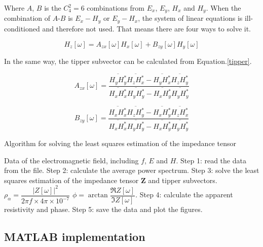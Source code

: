 \documentclass[9pt,a4paper,twoside]{rho-class/rho}
\begin{document}
Where $A$, $B$ is the $C_4^2=6$ combinations from $E_x$, $E_y$, $H_x$ and $H_y$. When the combination of $A$-$B$ is $E_x-H_y$ or $E_y-H_x$, the system of linear equations is ill-conditioned and therefore not used. That means there are four ways to solve it.

\begin{equation}
    \label{tipper}
    H_z[\omega]=A_{zx}[\omega]H_x[\omega]+B_{zy}[\omega]H_y[\omega]
\end{equation}

In the same way, the tipper subvector can be calculated from Equation.\eqref{tipper}.

\begin{equation}
    \label{azx}
    A_{zx}[\omega]=\dfrac{\overline{H_yH_y^\ast}\overline{H_zH_x^\ast}-\overline{H_yH_x^\ast}\overline{H_zH_y^\ast}}{\overline{H_xH_x^\ast}\overline{H_yH_y^\ast}-\overline{H_xH_y^\ast}\overline{H_yH_y^\ast}}
\end{equation}

\begin{equation}
    \label{bzy}
    B_{zy}[\omega]=\dfrac{\overline{H_xH_x^\ast}\overline{H_zH_y^\ast}-\overline{H_xH_y^\ast}\overline{H_zH_x^\ast}}{\overline{H_xH_x^\ast}\overline{H_yH_y^\ast}-\overline{H_xH_y^\ast}\overline{H_yH_y^\ast}}
\end{equation}

\begin{algorithm}[H]
    \caption{Algorithm for solving the least squares estimation of the impedance tensor}
    \label{alg:z}
    \begin{algorithmic}[1]
        \Require Data of the electromagnetic field, including $f$, $E$ and $H$.
        \State Step 1: read the data from the file.
        \State Step 2: calculate the average power spectrum.
        \State Step 3: solve the least squares estimation of the impedance tensor $\mathbf{Z}$ and tipper subvectors.
        \State $\rho_\alpha=\dfrac{|Z[\omega]|^2}{2\pi f\times 4\pi\times 10^{-7}}$
        \State $\phi=\arctan\dfrac{\mathfrak{R}Z[\omega]}{\mathfrak{I}Z[\omega]}$.
        \State Step 4: calculate the apparent resistivity and phase.
        \State Step 5: save the data and plot the figures.
    \end{algorithmic}
\end{algorithm}

\subsection{MATLAB implementation}
\end{document}

